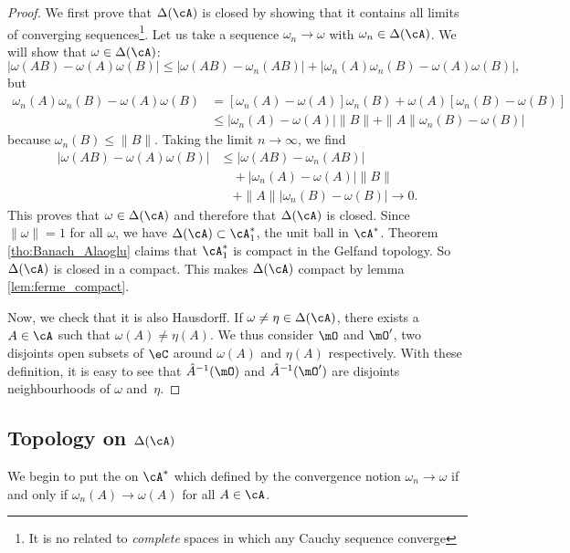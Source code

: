 \begin{proof}
We first prove that $\Delta(\cA)$ is closed by showing that it contains all limits of converging sequences\footnote{It is no related to \emph{complete} spaces in which any Cauchy sequence converge}. Let us take a sequence $\omega_n\to\omega$ with $\omega_n\in\Delta(\cA)$. We will show that $\omega\in\Delta(\cA)$:
\[ 
| \omega(AB)-\omega(A)\omega(B) | \leq| \omega(AB)-\omega_n(AB) |+| \omega_n(A)\omega_n(B)-\omega(A)\omega(B) |,
\]
but 
\[ 
 \begin{split}
\omega_n(A)\omega_n(B)-\omega(A)\omega(B)&=[\omega_n(A)-\omega(A)]\omega_n(B)+\omega(A)[\omega_n(B)-\omega(B)]\\
        &\leq | \omega_n(A)-\omega(A) |\| B \|+\| A \| \omega_n(B)-\omega(B) |
\end{split} 
\]
because $\omega_n(B)\leq \| B \|$. Taking the limit $n\to\infty$, we find
\[ 
 \begin{split}
| \omega(AB)-\omega(A)\omega(B) |&\leq| \omega(AB)-\omega_n(AB) |\\
        &\quad+| \omega_n(A)-\omega(A) |\| B \|\\
        &\quad+\| A \| |\omega_n(B)-\omega(B) |\to 0.
\end{split} 
\]
This proves that $\omega\in\Delta(\cA)$ and therefore that $\Delta(\cA)$ is closed. Since $\| \omega \|=1$ for all $\omega$, we have $\Delta(\cA)\subset\cA_1^*$, the unit ball in $\cA^*$. Theorem \ref{tho:Banach_Alaoglu} claims that $\cA_1^*$ is compact in the Gelfand topology. So $\Delta(\cA)$ is closed in a compact. This makes $\Delta(\cA)$ compact by lemma \ref{lem:ferme_compact}.

Now, we check that it is also Hausdorff. If $\omega\neq\eta\in\Delta(\cA)$, there exists a $A\in\cA$ such that $\omega(A)\neq\eta(A)$. We thus consider $\mO$ and $\mO'$, two disjoints open subsets of $\eC$ around $\omega(A)$ and $\eta(A)$ respectively. With these definition, it is easy to see that $\hat A^{-1}(\mO)$ and $\hat A^{-1}(\mO')$ are disjoints neighbourhoods of $\omega$ and~$\eta$.
\end{proof}
 

\subsection{Topology on \texorpdfstring{$\Delta(\cA)$}{DA}}\label{subsec:topo_Delta}
We begin to put the  on $\cA^*$ which defined by the convergence notion $\omega_n\to\omega$ if and only if $\omega_n(A)\to\omega(A)$ for all $A\in\cA$. 

